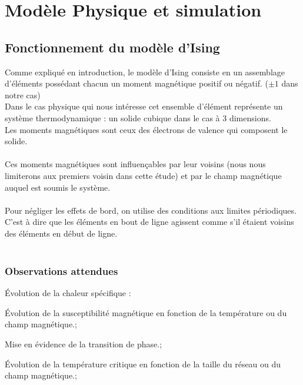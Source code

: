 \section{Modèle Physique et simulation}


\subsection{Fonctionnement du modèle d'Ising}

Comme expliqué en introduction, le modèle d'Ising consiste en un assemblage d'éléments possédant chacun un moment magnétique positif ou négatif. ($\pm 1$ dans notre cas)\\

Dans le cas physique qui nous intéresse cet ensemble d'élément représente un système thermodynamique : un solide cubique dans le cas à 3 dimensions.\\
Les moments magnétiques sont ceux des électrons de valence qui composent le solide.\\
\\
Ces moments magnétiques sont influençables par leur voisins (nous nous limiterons aux premiers voisin dans cette étude) et par le champ magnétique auquel est soumis le système.\\
\\
Pour négliger les effets de bord, on utilise des conditions aux limites périodiques. C'est à dire que les éléments en bout de ligne agissent comme s'il étaient voisins des éléments en début de ligne.\\
\\




\subsubsection{Observations attendues}
\item Évolution de la chaleur spécifique :\\


\item Évolution de la susceptibilité magnétique en fonction de la température ou du champ magnétique.;
\item Mise en évidence de la transition de phase.;
\item Évolution de la température critique en fonction de la taille du réseau ou du champ magnétique.;


